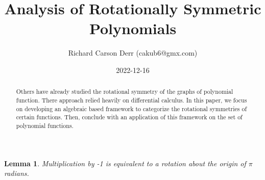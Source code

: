 \documentclass{article}
\title{Analysis of Rotationally Symmetric Polynomials}
\author{Richard Carson Derr (cakub6@gmx.com)}
\date{2022-12-16}
\newtheorem{lemma}{Lemma}
\begin{document}
\maketitle

\begin{abstract}
  Others have already studied the rotational symmetry
  of the graphs of polynomial function. There approach
  relied heavily on differential calculus. In this paper,
  we focus on developing an algebraic based framework
  to categorize the rotational symmetries of certain
  functions. Then, conclude with an application of this
  framework on the set of polynomial functions.
\end{abstract}

\begin{lemma}\label{negrot}
  Multiplication by -1 is equivalent to a rotation about the origin of $\pi$ radians.
\end{lemma}
\end{document}
